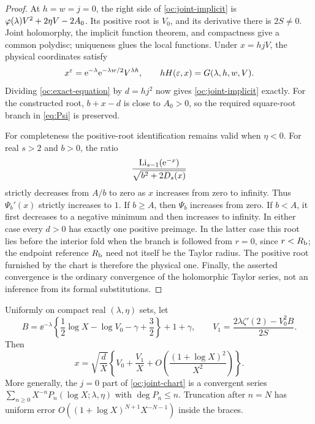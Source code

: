 \begin{proof}
At $h=w=j=0$, the right side of \eqref{oc:joint-implicit} is
$\varphi(\lambda)V^2+2\eta V-2A_0$. Its positive root is $V_0$, and
its derivative there is $2S\ne0$. Joint holomorphy, the implicit
function theorem, and compactness give a common polydisc; uniqueness
glues the local functions. Under $x=hjV$, the physical coordinates
satisfy
\[
 x^\varepsilon=\mathrm e^{-\lambda}\mathrm e^{-\lambda w/2}V^{\lambda h},
 \qquad hH(\varepsilon,x)=G(\lambda,h,w,V).
\]
Dividing \eqref{oc:exact-equation} by $d=hj^2$ now gives
\eqref{oc:joint-implicit} exactly. For the constructed root,
$b+x-d$ is close to $A_0>0$, so the required square-root branch in
\eqref{eq:Psi} is preserved.

For completeness the positive-root identification remains valid
when $\eta<0$. For real $s>2$ and $b>0$, the ratio
\[
 \frac{\operatorname{Li}_{s-1}(\mathrm e^{-x})}{\sqrt{b^2+2D_s(x)}}
\]
strictly decreases from $A/b$ to zero as $x$ increases from zero
to infinity. Thus $\Psi_b'(x)$ strictly increases to $1$.
If $b\ge A$, then $\Psi_b$ increases from zero. If $b<A$, it
first decreases to a negative minimum and then increases to
infinity. In either case every $d>0$ has exactly one positive
preimage. In the latter case this root lies before the interior
fold when the branch is followed from $r=0$, since $r<R_{\mathrm b}$;
the endpoint reference $R_{\mathrm b}$ need not itself be the Taylor radius.
The positive root furnished by the chart is therefore the physical
one. Finally, the asserted convergence is the ordinary convergence
of the holomorphic Taylor series, not an inference from its
formal substitutions.
\end{proof}

\begin{corollary}\label{cor:joint-first}
Uniformly on compact real $(\lambda,\eta)$ sets, let
\begin{equation}\label{oc:first-B}
 B=\ee^{-\lambda}
   \left\{\frac12\log X-\log V_0-\gamma+\frac32\right\}
      +1+\gamma,
 \qquad V_1=\frac{2\lambda\zeta'(2)-V_0^2B}{2S}.
\end{equation}
Then
\begin{equation}\label{oc:first-correction}
 x=\sqrt{\frac dX}
   \left\{V_0+\frac{V_1}{X}
       +O\left(\frac{(1+\log X)^2}{X^2}\right)\right\}.
\end{equation}
More generally, the $j=0$ part of \eqref{oc:joint-chart} is a
convergent series $\sum_{n\ge0}X^{-n}P_n(\log X;\lambda,\eta)$
with $\deg P_n\le n$. Truncation after $n=N$ has uniform error
$O((1+\log X)^{N+1}X^{-N-1})$ inside the braces.
\end{corollary}

